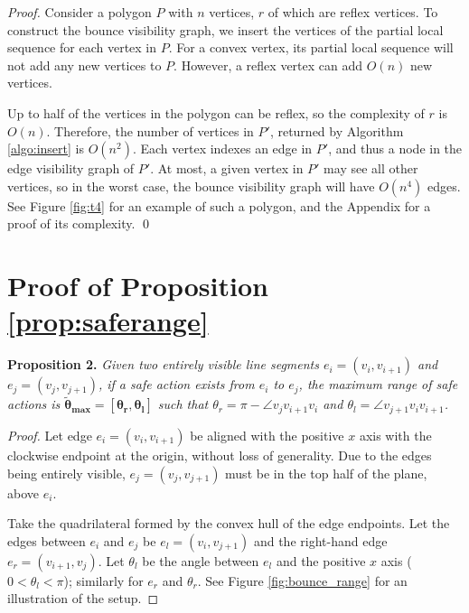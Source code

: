 \documentclass[]{styles/svproc}  %
\begin{document}
\begin{appendix}
\begin{proof}

Consider a polygon $P$ with $n$ vertices, $r$ of which are reflex vertices. To
construct the bounce visibility graph, we insert the vertices of the partial
local sequence for each vertex in $P$. For a convex vertex, its partial local sequence 
will not add any new vertices to $P$. However, a reflex vertex can add $O(n)$ new vertices. 

Up to half of the vertices in the polygon can be reflex, so the complexity of
$r$ is $O(n)$. Therefore, the number of vertices in $P'$, returned by Algorithm
\ref{algo:insert} is $O(n^2)$. Each vertex indexes an edge in $P'$, and
thus a node in the edge visibility graph of $P'$. At most, a given vertex in $P'$ may see all other vertices, so in the worst
case, the bounce visibility graph will have $O(n^4)$ edges. See Figure
\ref{fig:t4} for an example of such a polygon, and the Appendix for a proof of
its complexity. \qed

\end{proof}

\section{Proof of Proposition \ref{prop:saferange}}

\textbf{Proposition 2.} {\em
Given two entirely visible line segments $e_i = (v_i, v_{i+1})$ and $e_j =
(v_j, v_{j+1})$, if a safe action
exists from $e_i$ to $e_j$, the maximum range of safe actions is $\bm{\tilde{\theta}_{max} = [\theta_r, \theta_l]}$ such
that $\theta_r = \pi - \angle v_j v_{i+1} v_i$ and $\theta_l = \angle v_{j+1}
v_i v_{i+1}$.}

\begin{proof}

Let edge $e_i = (v_i, v_{i+1})$ be aligned with the positive $x$ axis with the clockwise
endpoint at the origin, without loss of generality. 
Due to the edges being
entirely visible, $e_j = (v_j, v_{j+1})$ must be in the top half of the plane, above
$e_i$.

Take the quadrilateral formed by the convex hull of the edge endpoints.
Let the edges between $e_i$ and $e_j$ be $e_l = (v_i, v_{j+1})$ and the right-hand edge 
$e_r = (v_{i+1}, v_j)$. Let $\theta_{l}$ be
the angle between $e_l$ and the positive $x$ axis ($0 < \theta_l < \pi$); similarly
for $e_r$ and $\theta_r$. See Figure \ref{fig:bounce_range} for an illustration of
the setup. 


\end{proof}
\end{appendix}
\end{document}
